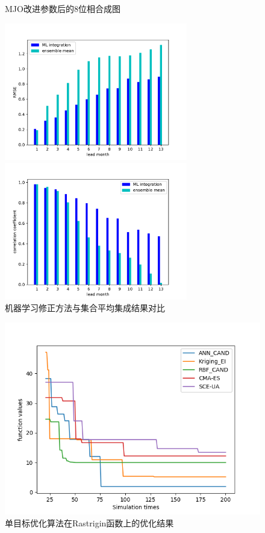 \begin{figure}[H]
{\begin{minipage}[t]{0.48\textwidth}
\caption{MJO改进参数后的8位相合成图}
\end{minipage}
}
\end{figure}

 \begin{figure}[H]
\centering
\begin{minipage}[t]{0.48\textwidth}
\centering
\includegraphics[width=8cm]{figures/RMSEensega.pdf}
\end{minipage}
\begin{minipage}[t]{0.48\textwidth}
\centering
\includegraphics[width=8cm]{figures/RMSEensegacorr.pdf}
\end{minipage}
\caption{机器学习修正方法与集合平均集成结果对比}
\end{figure}

\begin{figure}[H] %
  \centering
  \includegraphics[scale=0.6]{figures/all_Rast4.png}
  \caption{单目标优化算法在Rastrigin函数上的优化结果}
  \label{fig:xfig1}
\end{figure}

